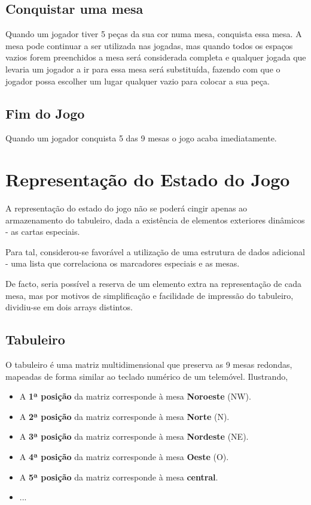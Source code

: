 \documentclass[a4paper]{article}
\begin{document}
\subsection{Conquistar uma mesa}
Quando um jogador tiver 5 peças da sua cor numa mesa, conquista essa mesa. A mesa pode continuar a ser utilizada nas jogadas, mas quando todos os espaços vazios forem preenchidos a mesa será considerada completa e qualquer jogada que levaria um jogador a ir para essa mesa será substituída, fazendo com que o jogador possa escolher um lugar qualquer vazio para colocar a sua peça.

\subsection{Fim do Jogo}
Quando um jogador conquista 5 das 9 mesas o jogo acaba imediatamente.

\newpage
\section{Representação do Estado do Jogo}
A representação do estado do jogo não se poderá cingir apenas ao armazenamento do tabuleiro, dada a existência de elementos exteriores dinâmicos - as cartas especiais.

Para tal, considerou-se favorável a utilização de uma estrutura de dados adicional - uma lista que correlaciona os marcadores especiais e as mesas.

De facto, seria possível a reserva de um elemento extra na representação de cada mesa, mas por motivos de simplificação e facilidade de impressão do tabuleiro, dividiu-se em dois arrays distintos.

\subsection{Tabuleiro}
O tabuleiro é uma matriz multidimensional que preserva as 9 mesas redondas, mapeadas de forma similar ao teclado numérico de um telemóvel. Ilustrando,

\begin{itemize}
\itemsep0em
\item A \textbf{1ª posição} da matriz corresponde à mesa \textbf{Noroeste} (NW).
\item A \textbf{2ª posição} da matriz corresponde à mesa \textbf{Norte} (N).
\item A \textbf{3ª posição} da matriz corresponde à mesa \textbf{Nordeste} (NE).
\item A \textbf{4ª posição} da matriz corresponde à mesa \textbf{Oeste} (O).
\item A \textbf{5ª posição} da matriz corresponde à mesa \textbf{central}.
\item ...
\end{itemize}
\end{document}
